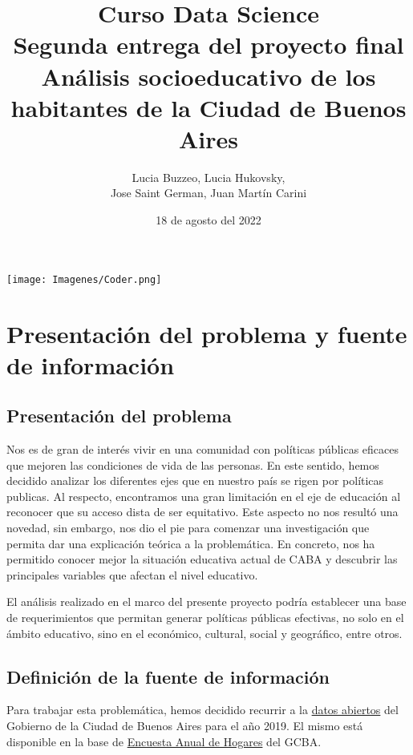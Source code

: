 \documentclass[a4paper]{article}
\title{Curso Data Science \\ \vspace{0.5cm} Segunda entrega del proyecto final\\ \vspace{0.5cm}
Análisis socioeducativo de los habitantes de la Ciudad de Buenos Aires}
\author{Lucia Buzzeo, Lucia Hukovsky,\\ Jose Saint German, Juan Martín Carini}
\date{18 de agosto del 2022}
\begin{document}
\maketitle

\begin{center}
    \texttt{[image: Imagenes/Coder.png]}
\end{center}

\thispagestyle{empty}

\newpage

\tableofcontents

\newpage

\section{Presentación del problema y fuente de información}

    \subsection{Presentación del problema}

        Nos es de gran de interés vivir en una comunidad con políticas públicas eficaces que mejoren las condiciones de vida de las personas. En este sentido, hemos decidido analizar los diferentes ejes que en nuestro país se rigen por políticas publicas. Al respecto, encontramos una gran limitación en el eje de educación al reconocer que su acceso dista de ser equitativo. Este aspecto no nos resultó una novedad, sin embargo, nos dio el pie para comenzar una investigación que permita dar una explicación teórica a la problemática. 
        En concreto, nos ha permitido conocer mejor la situación educativa actual de CABA y descubrir las principales variables que afectan el nivel educativo.
        
        El análisis realizado en el marco del presente proyecto podría establecer una base de requerimientos que permitan generar políticas públicas efectivas, no solo en el ámbito educativo, sino en el económico, cultural, social y geográfico, entre otros.

        \subsection{Definición de la fuente de información}

        Para trabajar esta problemática, hemos decidido recurrir a la \href{https://www.estadisticaciudad.gob.ar/eyc/?page_id=702}{datos abiertos} del Gobierno de la Ciudad de Buenos Aires para el año 2019. El mismo está disponible en la base de \href{https://data.buenosaires.gob.ar/dataset/encuesta-anual-hogares/resource/3a45c563-396d-42de-ba93-8a93729e0723}{Encuesta Anual de Hogares} del GCBA.
\end{document}
